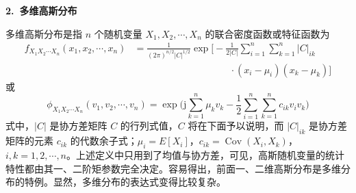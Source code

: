 \documentclass[11pt,openany,UTF8]{ctexbook}
\newcommand{\ju}{\mathrm{j}}                       %
\DeclareMathOperator{\Cov}{Cov}                    %
\newcommand{\bhead}[1]{\par\medskip\noindent\textbf{#1}\par\smallskip}
\begin{document}
\bhead{2.\ 多维高斯分布}
多维高斯分布是指 $n$ 个随机变量 $X_1,X_2,\cdots,X_n$ 的联合密度函数或特征函数为
\begin{equation}
\begin{aligned}
f_{X_1X_2\cdots X_n}(x_1,x_2,\cdots,x_n)
&=\frac{1}{(2\pi)^{n/2}\lvert C\rvert^{1/2}}
\exp\Biggl[-\frac{1}{2\lvert C\rvert}\sum_{i=1}^{n}\sum_{k=1}^{n}\lvert C\rvert_{ik}\\
&\qquad\qquad\qquad\qquad\qquad
\cdot(x_i-\mu_i)(x_k-\mu_k)\Biggr]
\end{aligned}
\label{eq:2.28}
\end{equation}
或
\begin{equation}
\phi_{X_1X_2\cdots X_n}(v_1,v_2,\cdots,v_n)
=\exp\Biggl(\ju\sum_{k=1}^{n}\mu_kv_k-\frac{1}{2}\sum_{i=1}^{n}\sum_{k=1}^{n}c_{ik}v_iv_k\Biggr)
\label{eq:2.29}
\end{equation}
式中\nobreak，$\lvert C\rvert$ 是协方差矩阵 $C$ 的行列式值\nobreak，$C$ 将在下面予以说明\nobreak，而 $\lvert C\rvert_{ik}$ 是协方差矩阵的元素 $c_{ik}$ 的代数余子式\nobreak；$\mu_i=E[X_i]$\nobreak，$c_{ik}=\Cov(X_i,X_k)$\nobreak，$i,k=1,2,\cdots,n$\nobreak。上述定义中只用到了均值与协方差\nobreak，可见\nobreak，高斯随机变量的统计特性都由其一\nobreak、二阶矩参数完全决定\nobreak。容易得出\nobreak，前面一\nobreak、二维高斯分布是多维分布的特例\nobreak。显然\nobreak，多维分布的表达式变得比较复杂\nobreak。
\end{document}
